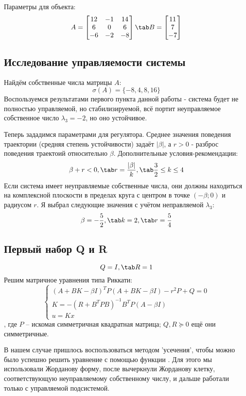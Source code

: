 Параметры для объекта:
$$
  A = \begin{bmatrix}
  12 & -1 & 14 \\
  6 & 0 & 6 \\
  -6 & -2 & -8 
  \end{bmatrix} \tab
  B = \begin{bmatrix}
    11 \\ 7 \\ -7 
  \end{bmatrix}
$$



\subsection{Исследование управляемости системы}
Найдём собственные числа матрицы $A$:
$$
    \sigma(A) = \{-8, 4, 8, 16\}
$$
Воспользуемся результатами первого пункта данной работы - система будет не полностью управляемой, но стабилизируемой, всё портит неуправляемое собственное число $\lambda_3 = -2$, но оно устойчивое.

Теперь зададимся параметрами для регулятора. Среднее значения поведения траектории (средняя степень устойчивости) задаёт $|\beta|$, а $r > 0$ - разброс поведения траектоий относительно $\beta$.
Дополнительные условия-рекомендации:
$$
  \beta+r <0, \tab r=\frac{|\beta|}{k}, \tab \frac{3}{2} \leq k \leq 4
$$
Если система имеет неуправляемые собственные числа, они должны находиться на комплексной плоскости в пределах круга с
 центром в точке $(−\beta;0)$ и радиусом $r$. Я выбрал следующие значения с учётом неправляемой $\lambda_3$:
$$
  \beta = -\frac{5}{2}, \tab k=2, \tab r = \frac{5}{4}
$$

\newpage
\subsection{Первый набор Q и R}
$$Q=I, \tab R = 1$$
Решим  матричное уравнения типа Риккати:
$$
\begin{cases}
  (A+BK-\beta I)^TP(A+BK-\beta I) - r^2P + Q = 0 \\
  K = -(R + B^TPB)^{-1}B^TP(A-\beta I) \\
  u = Kx
\end{cases}
$$, где $P$ – искомая симметричная квадратная матрица; $Q,R  \succeq 0 $ ещё они симметричные. 

В нашем случае пришлось воспользоваться методом 'усечения', чтобы можно было успешно решить уравнение с помощью
функции . Для этого мы использовали Жорданову форму, после вычеркнули Жорданову клетку, соответствующую неуправляемому собственному числу, 
и дальше работали только с управляемой подсистемой.


